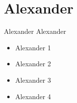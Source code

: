 \section{Alexander}
\begin{frame}{Alexander}{}
  Alexander
  \begin{itemize}
    \item<1-> Alexander 1
    \item<2-> Alexander 2
    \item<3-> Alexander 3
    \item<4-> Alexander 4
  \end{itemize}
\end{frame}
